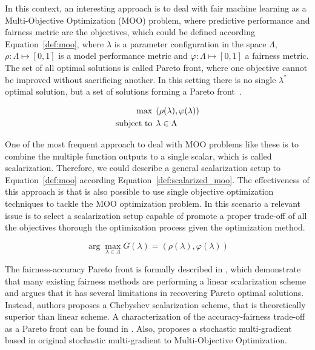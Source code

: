 In this context, an interesting approach is to deal with fair machine learning as a Multi-Objective Optimization (MOO) problem, where predictive performance and fairness metric are the objectives, which could be defined according Equation~\ref{def:moo}, where $\lambda$ is a parameter configuration in the space $\Lambda$, $\rho: \Lambda \mapsto [0,1]$ is a model performance metric and $\varphi: \Lambda \mapsto [0,1]$ a fairness metric. The set of all optimal solutions is called Pareto front, where one objective cannot be improved without sacrificing another. In this setting there is no single $\lambda^*$ optimal solution, but a set of solutions forming a Pareto front~\citep{pareto1906manuale}.

\begin{align}\label{def:moo}
\max &\hspace{1ex} (\rho(\lambda), \varphi(\lambda)) \\
\text{subject to} &\hspace{1ex} \lambda\in\Lambda \nonumber
\end{align}

One of the most frequent approach to deal with MOO problems like these is to combine the multiple function outputs to a single scalar, which is called scalarization. Therefore, we could describe a general scalarization setup to Equation~\ref{def:moo} according Equation~\ref{def:scalarized_moo}. The effectiveness of this approach is that is also possible to use single objective optimization techniques to tackle the MOO optimization problem. In this scenario a relevant issue is to select a scalarization setup capable of promote a proper trade-off of all the objectives thorough the optimization process given the optimization method.

\begin{equation}\label{def:scalarized_moo}
\arg\max\limits_{\lambda\in\Lambda} G(\lambda) = (\rho(\lambda), \varphi(\lambda))
\end{equation}

The fairness-accuracy Pareto front is formally described in \cite{Wei2022}, which demonstrate that many existing fairness methods are performing a linear scalarization scheme and argues that it has several limitations in recovering Pareto optimal solutions. Instead, authors proposes a Chebyshev scalarization scheme, that is theoretically superior than linear scheme. A characterization of the accuracy-fairness trade-off as a Pareto front can be found in \cite{Liu2022}. Also, \cite{Mercier2018} proposes a stochastic multi-gradient based in original stochastic multi-gradient to Multi-Objective Optimization.

